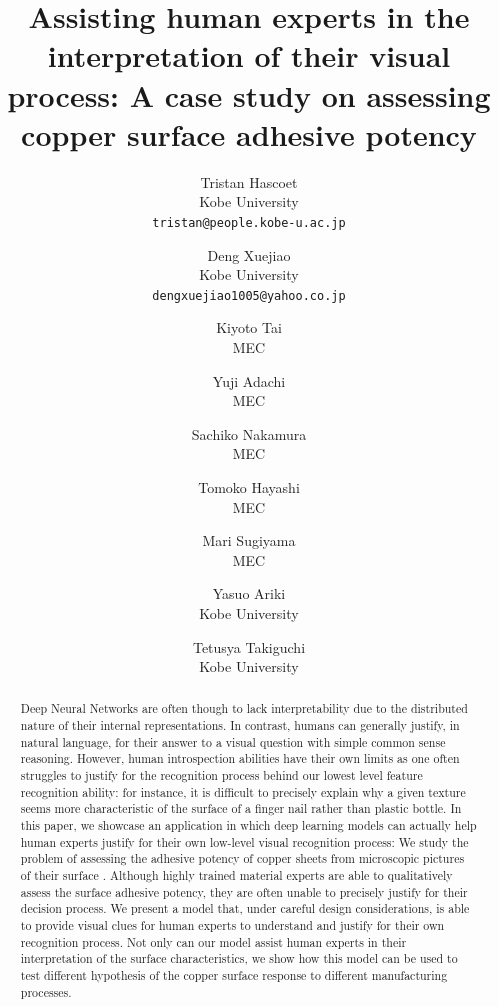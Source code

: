 \documentclass[10pt,twocolumn,letterpaper]{article}
\begin{document}
	
	\title{Assisting human experts in the interpretation of their visual process: A case study on assessing copper surface adhesive potency}%
	
	\author{
		Tristan Hascoet\\
		Kobe University\\
		{\tt\small tristan@people.kobe-u.ac.jp}
		\and
		Deng Xuejiao\\
		Kobe University\\
		{\tt\small dengxuejiao1005@yahoo.co.jp}
		\and
		Kiyoto Tai\\
		MEC\\
		\and
		Yuji Adachi \\
		MEC \\
		\and
		Sachiko Nakamura\\
		MEC\\
		\and
		Tomoko Hayashi\\
		MEC\\
		\and
		Mari Sugiyama\\
		MEC\\
		\and
		Yasuo Ariki\\
		Kobe University\\
		\and
		Tetusya Takiguchi\\
		Kobe University\\
	}
	
	\maketitle
	
	
	\begin{abstract}
		Deep Neural Networks are often though to lack interpretability due to the distributed nature of their internal representations. In contrast, humans can generally justify, in natural language, for their answer to a visual question with simple common sense reasoning. However, human introspection abilities have their own limits as one often struggles to justify for the recognition process behind our lowest level feature recognition ability: for instance, it is difficult to precisely explain why a given texture seems more characteristic of the surface of a finger nail rather than plastic bottle.
		In this paper, we showcase an application in which deep learning models can actually  help human experts justify for their own low-level visual recognition process: We study the problem of assessing the adhesive potency of copper sheets from microscopic pictures of their surface . Although highly trained material experts are able to qualitatively assess the surface adhesive potency, they are often unable to precisely justify for their decision process. We present a model that, under careful design considerations, is able to provide visual clues for human experts to understand and justify for their own recognition process. 
		Not only can our model assist human experts in their interpretation of the surface characteristics, 
		we show how this model can be used to test different hypothesis of the copper surface response to different manufacturing processes. 
	\end{abstract}
	
\end{document}
